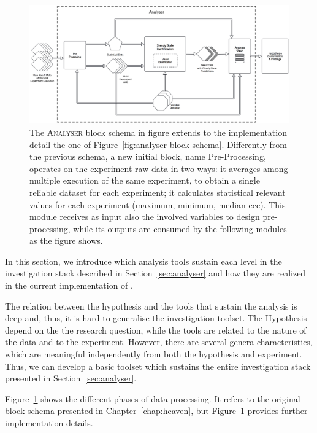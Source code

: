 \begin{figure}[tbh]
  \centering
	\includegraphics[width=\linewidth]{images/analyser-block-schema-impl}
	\caption[\textsc{Analyser} Block Schema: Implementation Detail Level]{The \textsc{Analyser} block schema in figure extends to the implementation detail the one of Figure~\ref{fig:analyser-block-schema}. Differently from the previous schema, a new initial block, name Pre-Processing, operates on the experiment raw data in two ways: it averages among multiple execution of the same experiment, to obtain a single reliable dataset for each experiment; it calculates statistical relevant values for each experiment (maximum, minimum, median ecc). This module receives as input also the involved variables to design pre-processing, while its outputs are consumed by the following modules as the figure shows.}
  	\label{fig:analyser-block-schema-impl}
\end{figure}

\noindent In this section, we introduce which analysis tools sustain each level in the investigation stack described in Section~\ref{sec:analyser} and how they are realized in the current implementation of \namens. 

The relation between the hypothesis and the tools that sustain the analysis is deep and, thus, it is hard to generalise the investigation toolset. The Hypothesis depend on the the research question, while the tools are related to the nature of the data and to the experiment.  However, there are several genera characteristics, which are meaningful independently from both the hypothesis and experiment. Thus, we can develop a basic toolset which sustains the entire investigation stack presented in Section~\ref{sec:analyser}.

Figure~\ref{fig:analyser-block-schema-impl} shows the different phases of data processing. It refers to the original block schema presented in Chapter~\ref{chap:heaven}, but Figure~\ref{fig:analyser-block-schema-impl}  provides further implementation details.\\ 

